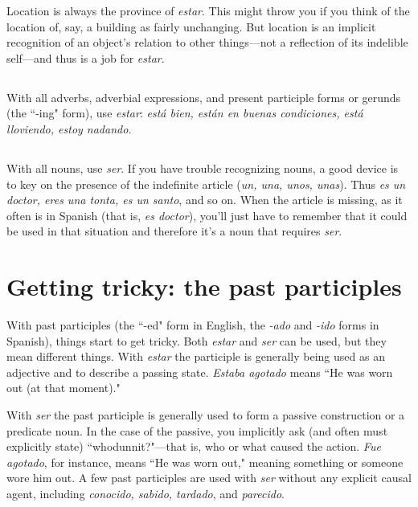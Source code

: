Location is always the province of \emph{estar}. This might throw
you if you think of the location of, say, a building as fairly unchanging.
But location is an implicit recognition of an object's relation to other
things---not a reflection of its indelible self---and thus is a job for
\emph{estar}.

\subsection{}

With all adverbs, adverbial expressions, and present participle forms or gerunds (the ``-ing" form), use \emph{estar}: \emph{está bien, están en
buenas condiciones, está lloviendo, estoy nadando.}

\subsection{}

With all nouns, use \emph{ser}. If you have trouble recognizing
nouns, a good device is to key on the presence of the indefinite article
(\emph{un, una, unos, unas}). Thus \emph{es un doctor, eres una tonta, es un santo},
and so on. When the article is missing, as it often is in Spanish (that is,
\emph{es doctor}), you'll just have to remember that it could be used in that
situation and therefore it's a noun that requires \emph{ser}.

\section{Getting tricky: the past participles}

With past participles (the ``-ed" form in English, the \emph{-ado} and
\emph{-ido} forms in Spanish), things start to get tricky. Both \emph{estar} and \emph{ser}
can be used, but they mean different things. With \emph{estar} the participle
is generally being used as an adjective and to describe a passing state.
\emph{Estaba agotado} means ``He was worn out (at that moment)."

With \emph{ser} the past participle is generally used to form a passive
construction or a predicate noun. In the case of the passive, you implicitly ask (and often must explicitly state) ``whodunnit?"---that is,
who or what caused the action. \emph{Fue agotado}, for instance, means ``He
was worn out," meaning something or someone wore him out. A few
past participles are used with \emph{ser} without any explicit causal agent, including \emph{conocido, sabido, tardado}, and \emph{parecido}.

